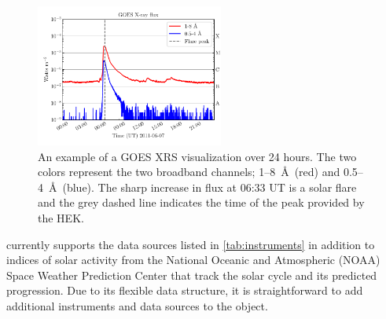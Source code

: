 \begin{figure}
    \centering
    \includegraphics[width=0.55\textwidth]{figures/timeseries_example.pdf}
    \caption{An example of a GOES XRS \Timeseries visualization over 24 hours. The two colors represent the two broadband channels; 1--8~\AA\ (red) and 0.5--4~\AA\ (blue).  The sharp increase in flux at 06:33 UT is a solar flare and the grey dashed line indicates the time of the peak provided by the HEK.}
    \label{fig:timeseries_example}
\end{figure}

\Timeseries currently supports the data sources listed in \autoref{tab:instruments} in addition to indices of solar activity from the National Oceanic and Atmospheric (NOAA) Space Weather Prediction Center that track the solar cycle and its predicted progression. Due to its flexible data structure, it is straightforward to add additional instruments and data sources to the \Timeseries object.

